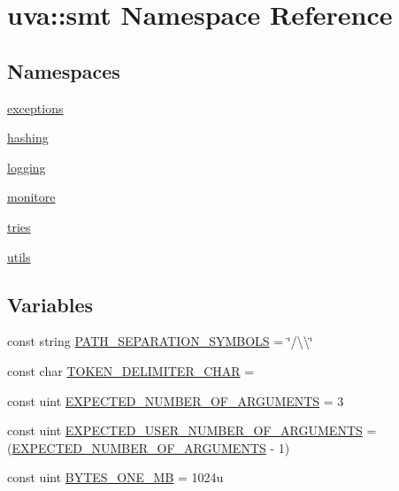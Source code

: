 \hypertarget{namespaceuva_1_1smt}{}\section{uva\+:\+:smt Namespace Reference}
\label{namespaceuva_1_1smt}
\subsection*{Namespaces}
\begin{DoxyCompactItemize}
\item 
 \hyperlink{namespaceuva_1_1smt_1_1exceptions}{exceptions}
\item 
 \hyperlink{namespaceuva_1_1smt_1_1hashing}{hashing}
\item 
 \hyperlink{namespaceuva_1_1smt_1_1logging}{logging}
\item 
 \hyperlink{namespaceuva_1_1smt_1_1monitore}{monitore}
\item 
 \hyperlink{namespaceuva_1_1smt_1_1tries}{tries}
\item 
 \hyperlink{namespaceuva_1_1smt_1_1utils}{utils}
\end{DoxyCompactItemize}
\subsection*{Variables}
\begin{DoxyCompactItemize}
\item 
const string \hyperlink{namespaceuva_1_1smt_afb9a44bd9eb3ded951a6f0c41f07c108}{P\+A\+T\+H\+\_\+\+S\+E\+P\+A\+R\+A\+T\+I\+O\+N\+\_\+\+S\+Y\+M\+B\+O\+L\+S} = \char`\"{}/\textbackslash{}\textbackslash{}\char`\"{}
\item 
const char \hyperlink{namespaceuva_1_1smt_a83e439b9599a06adad4132cbfa40e4e3}{T\+O\+K\+E\+N\+\_\+\+D\+E\+L\+I\+M\+I\+T\+E\+R\+\_\+\+C\+H\+A\+R} = \textquotesingle{} \textquotesingle{}
\item 
const uint \hyperlink{namespaceuva_1_1smt_a2914c44c8d1f679d2c8e79543bd915cf}{E\+X\+P\+E\+C\+T\+E\+D\+\_\+\+N\+U\+M\+B\+E\+R\+\_\+\+O\+F\+\_\+\+A\+R\+G\+U\+M\+E\+N\+T\+S} = 3
\item 
const uint \hyperlink{namespaceuva_1_1smt_a3e6faa2f4ff7b75ea9e1d8eca32c45bd}{E\+X\+P\+E\+C\+T\+E\+D\+\_\+\+U\+S\+E\+R\+\_\+\+N\+U\+M\+B\+E\+R\+\_\+\+O\+F\+\_\+\+A\+R\+G\+U\+M\+E\+N\+T\+S} = (\hyperlink{namespaceuva_1_1smt_a2914c44c8d1f679d2c8e79543bd915cf}{E\+X\+P\+E\+C\+T\+E\+D\+\_\+\+N\+U\+M\+B\+E\+R\+\_\+\+O\+F\+\_\+\+A\+R\+G\+U\+M\+E\+N\+T\+S} -\/ 1)
\item 
const uint \hyperlink{namespaceuva_1_1smt_aa523eb99b0238e896a2c4448fb2016c7}{B\+Y\+T\+E\+S\+\_\+\+O\+N\+E\+\_\+\+M\+B} = 1024u
\end{DoxyCompactItemize}


